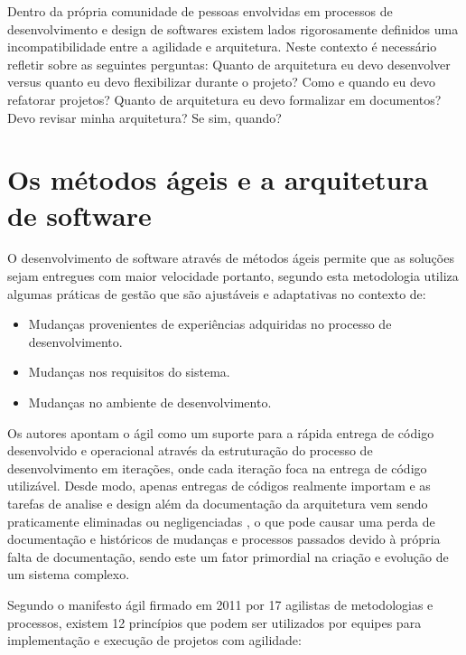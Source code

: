 Dentro da própria comunidade de pessoas envolvidas em processos de desenvolvimento e design de softwares existem lados rigorosamente definidos  uma incompatibilidade entre a agilidade e arquitetura. Neste contexto é necessário refletir sobre as seguintes perguntas: Quanto de arquitetura eu devo desenvolver versus quanto eu devo flexibilizar durante o projeto? Como e quando eu devo refatorar projetos? Quanto de arquitetura eu devo formalizar em documentos? Devo revisar minha arquitetura? Se sim, quando?
\cite{babar2013agile}

\section{Os métodos ágeis e a arquitetura de software}

O desenvolvimento de software através de métodos ágeis permite que as soluções sejam entregues com maior velocidade portanto, segundo \cite{turk2014limitations} esta metodologia utiliza algumas práticas de gestão que são ajustáveis e adaptativas no contexto de:
    \begin{itemize}
        \item Mudanças provenientes de experiências adquiridas no processo de desenvolvimento.
        \item Mudanças nos requisitos do sistema.
        \item Mudanças no ambiente de desenvolvimento.
    \end{itemize}

Os autores apontam o ágil como um suporte para a rápida entrega de código desenvolvido e operacional através da estruturação do processo de desenvolvimento em iterações, onde cada iteração foca na entrega de código utilizável. Desde modo, apenas entregas de códigos realmente importam e as tarefas de analise e design além da documentação da arquitetura vem sendo praticamente eliminadas ou negligenciadas \cite{waterman2015much}, o que pode causar uma perda de documentação e históricos de mudanças e processos passados devido à própria falta de documentação, sendo este um fator primordial na criação e evolução de um sistema complexo.

Segundo o manifesto ágil \cite{manifestoagil} firmado em 2011 por 17 agilistas de metodologias e processos, existem 12 princípios que podem ser utilizados por equipes para implementação e execução de projetos com agilidade:

